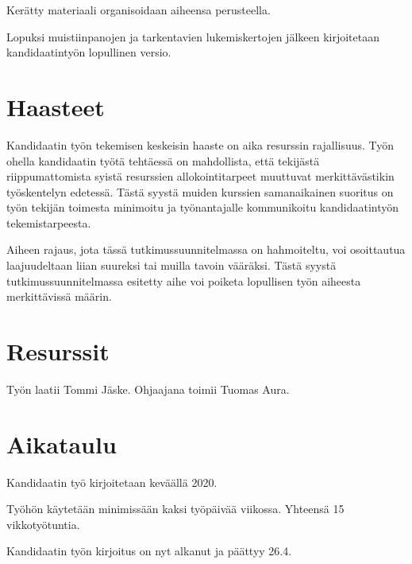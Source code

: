\documentclass[12pt,a4paper,finnish,oneside]{article}
\begin{document}
Kerätty materiaali organisoidaan aiheensa perusteella.

Lopuksi muistiinpanojen ja tarkentavien lukemiskertojen jälkeen kirjoitetaan kandidaatintyön lopullinen versio.


\section{Haasteet}

Kandidaatin työn tekemisen keskeisin haaste on aika resurssin rajallisuus. 
Työn ohella kandidaatin työtä tehtäessä on mahdollista, että tekijästä riippumattomista 
syistä resurssien allokointitarpeet muuttuvat merkittävästikin työskentelyn edetessä. 
Tästä syystä muiden kurssien samanaikainen suoritus on työn tekijän toimesta minimoitu ja 
työnantajalle kommunikoitu kandidaatintyön tekemistarpeesta.

Aiheen rajaus, jota tässä tutkimussuunnitelmassa on hahmoiteltu, voi osoittautua laajuudeltaan 
liian suureksi tai muilla tavoin vääräksi. Tästä syystä tutkimussuunnitelmassa esitetty aihe voi poiketa lopullisen työn aiheesta merkittävissä määrin.

\section{Resurssit}

Työn laatii Tommi Jäske. 
Ohjaajana toimii Tuomas Aura.

\section{Aikataulu}

Kandidaatin työ kirjoitetaan keväällä 2020.

Työhön käytetään minimissään kaksi työpäivää viikossa. Yhteensä 15 vikkotyötuntia.

Kandidaatin työn kirjoitus on nyt alkanut ja päättyy 26.4.
\end{document}
